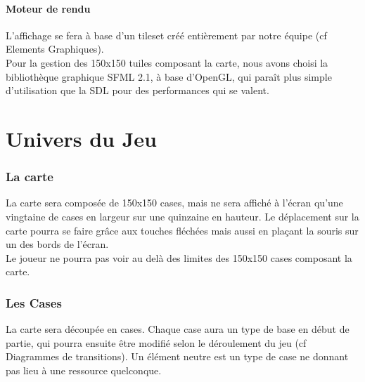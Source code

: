 \documentclass[a4paper]{article}
\begin{document}
        \subsection{Moteur de rendu}
          L'affichage se fera à base d'un tileset créé entièrement par notre équipe (cf Elements Graphiques).\\
          Pour la gestion des 150x150 tuiles composant la carte, nous avons choisi la bibliothèque graphique SFML 2.1, à base d'OpenGL, qui paraît plus simple d'utilisation que la SDL pour des performances qui se valent.


  \newpage
  \part{Univers du Jeu}
    \section{La carte}

      La carte sera composée de 150x150 cases, mais ne sera affiché à l'écran qu'une vingtaine de cases en largeur sur une quinzaine en hauteur. Le déplacement sur la carte pourra se faire grâce aux touches fléchées mais aussi en plaçant la souris sur un des bords de l'écran.\\
      Le joueur ne pourra pas voir au delà des limites des 150x150 cases composant la carte.

    \section{Les Cases}

      La carte sera découpée en cases. Chaque case aura un type de base en début de partie, qui pourra ensuite être modifié selon le déroulement du jeu (cf Diagrammes de transitions). Un élément neutre est un type de case ne donnant pas lieu à une ressource quelconque.

	  
\end{document}
